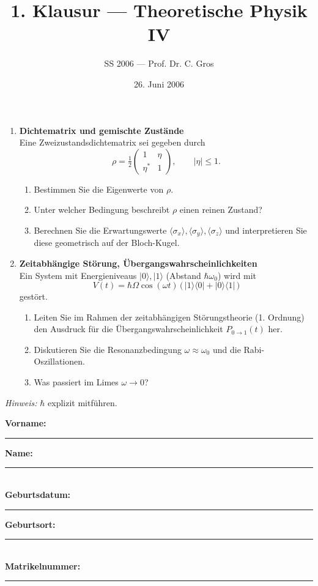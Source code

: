 \documentclass[11pt,a4paper]{article}
\begin{document}
\begin{enumerate}
\item \textbf{Dichtematrix und gemischte Zustände}\\
Eine Zweizustandsdichte­matrix sei gegeben durch
\[
\rho=\tfrac12\begin{pmatrix}1 & \eta \\ \eta^* & 1\end{pmatrix},\qquad |\eta|\leq 1.
\]
\begin{enumerate}
  \item Bestimmen Sie die Eigenwerte von \(\rho\).
  \item Unter welcher Bedingung beschreibt \(\rho\) einen reinen Zustand?
  \item Berechnen Sie die Erwartungswerte \(\langle\sigma_x\rangle,\langle\sigma_y\rangle,\langle\sigma_z\rangle\) und interpretieren Sie diese geometrisch auf der Bloch-Kugel.
\end{enumerate}

\item \textbf{Zeitabhängige Störung, Übergangswahrscheinlichkeiten}\\
Ein System mit Energieniveaus \(|0\rangle, |1\rangle\) (Abstand \(\hbar\omega_0\)) wird mit
\[
V(t)=\hbar\Omega\cos(\omega t)\,\bigl(\,|1\rangle\langle 0|+|0\rangle\langle 1|\,\bigr)
\]
gestört.
\begin{enumerate}
  \item Leiten Sie im Rahmen der zeitabhängigen Störungstheorie (1. Ordnung) den Ausdruck für die Übergangswahrscheinlichkeit \(P_{0\to 1}(t)\) her.
  \item Diskutieren Sie die Resonanzbedingung \(\omega\approx\omega_0\) und die Rabi-Oszillationen.
  \item Was passiert im Limes \(\omega\to 0\)?
\end{enumerate}

\end{enumerate}

\vfill
\noindent\textit{Hinweis:} \(\hbar\) explizit mitführen.



\pagebreak


\title{1. Klausur — Theoretische Physik IV}
\author{SS 2006 — Prof. Dr. C. Gros}
\date{26. Juni 2006}


\noindent\textbf{Vorname:} \rule{0.4\linewidth}{0.4pt}\quad
\textbf{Name:} \rule{0.4\linewidth}{0.4pt}\\[0.5em]
\textbf{Geburtsdatum:} \rule{0.3\linewidth}{0.4pt}\quad
\textbf{Geburtsort:} \rule{0.4\linewidth}{0.4pt}\\[0.5em]
\textbf{Matrikelnummer:} \rule{0.5\linewidth}{0.4pt}
\end{document}

